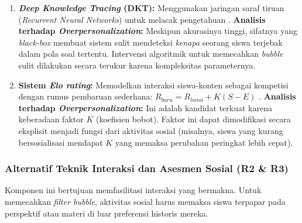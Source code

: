 \begin{enumerate}
    \item \textbf{\textit{Deep Knowledge Tracing} (DKT):}
    Menggunakan jaringan saraf tiruan (\textit{Recurrent Neural Networks}) untuk melacak pengetahuan \autocite{Minn2022}.
    \textbf{Analisis terhadap \textit{Overpersonalization}:} Meskipun akurasinya tinggi, sifatnya yang \textit{black-box} membuat sistem sulit mendeteksi \textit{kenapa} seorang siswa terjebak dalam pola soal tertentu. Intervensi algoritmik untuk memecahkan \textit{bubble} sulit dilakukan secara terukur karena kompleksitas parameternya.

    \item \textbf{Sistem \textit{Elo rating}:}
    Memodelkan interaksi siswa-konten sebagai kompetisi dengan rumus pembaruan sederhana: $R_{baru} = R_{lama} + K(S - E)$ \autocite{Vesin2022}.
    \textbf{Analisis terhadap \textit{Overpersonalization}:} Ini adalah kandidat terkuat karena keberadaan faktor $K$ (koefisien bobot). Faktor ini dapat dimodifikasi secara eksplisit menjadi fungsi dari aktivitas sosial (misalnya, siswa yang kurang bersosialisasi mendapat $K$ yang memaksa perubahan peringkat lebih cepat).
\end{enumerate}

\subsubsection{Alternatif Teknik Interaksi dan Asesmen Sosial (R2 \& R3)}
\label{sssec:alternatif_asesmen_sosial}
Komponen ini bertujuan memfasilitasi interaksi yang bermakna. Untuk memecahkan \textit{filter bubble}, aktivitas sosial harus memaksa siswa terpapar pada perspektif atau materi di luar preferensi historis mereka.

